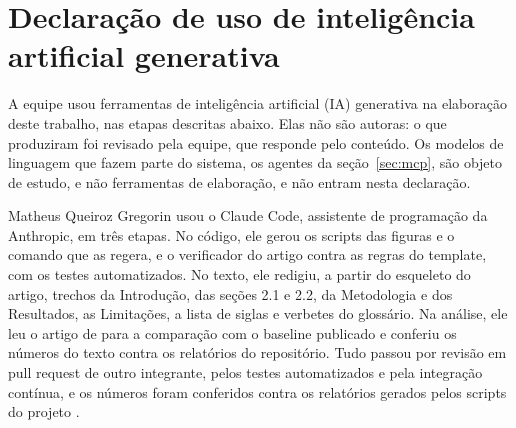 \section*{Declaração de uso de inteligência artificial generativa}
\label{sec:declaracao-ia}

A equipe usou ferramentas de inteligência artificial (IA) generativa na elaboração deste trabalho, nas etapas descritas abaixo. Elas não são autoras: o que produziram foi revisado pela equipe, que responde pelo conteúdo. Os modelos de linguagem que fazem parte do sistema, os agentes da seção~\ref{sec:mcp}, são objeto de estudo, e não ferramentas de elaboração, e não entram nesta declaração.

Matheus Queiroz Gregorin usou o Claude Code, assistente de programação da Anthropic, em três etapas. No código, ele gerou os scripts das figuras e o comando que as regera, e o verificador do artigo contra as regras do template, com os testes automatizados. No texto, ele redigiu, a partir do esqueleto do artigo, trechos da Introdução, das seções 2.1 e 2.2, da Metodologia e dos Resultados, as Limitações, a lista de siglas e verbetes do glossário. Na análise, ele leu o artigo de  para a comparação com o baseline publicado e conferiu os números do texto contra os relatórios do repositório. Tudo passou por revisão em pull request de outro integrante, pelos testes automatizados e pela integração contínua, e os números foram conferidos contra os relatórios gerados pelos scripts do projeto \cite{oliveira2026}.

